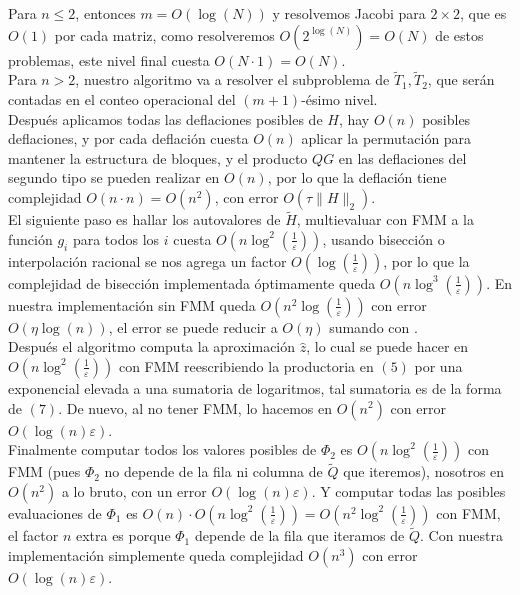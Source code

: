 \documentclass[11pt,a4paper]{article}
\begin{document}
Para $n\leq 2$, entonces $m=O(\log(N))$ y resolvemos Jacobi para $2\times 2$, que es $O(1)$ por cada matriz, como resolveremos $O(2^{\log(N)})=O(N)$ de estos problemas, este nivel final cuesta $O(N \cdot 1)=O(N)$.\\

Para $n>2$, nuestro algoritmo va a resolver el subproblema de $\tilde T _1, \tilde T_2$, que serán contadas en el conteo operacional del $(m+1)$-ésimo nivel.\\

Después aplicamos todas las deflaciones posibles de $H$, hay $O(n)$ posibles deflaciones, y por cada deflación cuesta $O(n)$ aplicar la permutación para mantener la estructura de bloques, y el producto $QG$ en las deflaciones del segundo tipo se pueden realizar en $O(n)$, por lo que la deflación tiene complejidad $O(n \cdot n)=O(n^2)$, con error $O(\tau \|H\|_2)$.\\

El siguiente paso es hallar los autovalores de $\tilde{H}$, multievaluar con FMM a la función $g_i$ para todos los $i$ cuesta $O(n\log^2(\frac1\varepsilon))$, usando bisección o interpolación racional se nos agrega un factor $O(\log(\frac1\varepsilon))$, por lo que la complejidad de bisección implementada óptimamente queda $O(n\log^3(\frac1\varepsilon))$. En nuestra implementación sin FMM queda $O(n^2\log(\frac1\varepsilon))$ con error $O(\eta \log(n))$, el error se puede reducir a $O(\eta)$ sumando con \cite{ExactSum}. \\

Después el algoritmo computa la aproximación $\hat{z}$, lo cual se puede hacer en $O(n\log^2(\frac1\varepsilon))$ con FMM reescribiendo la productoria en $(5)$ por una exponencial elevada a una sumatoria de logaritmos, tal sumatoria es de la forma de $(7)$. De nuevo, al no tener FMM, lo hacemos en $O(n^2)$ con error $O(\log(n)\varepsilon)$.\\

Finalmente computar todos los valores posibles de $\Phi_2$ es $O(n\log^2(\frac1\varepsilon))$ con FMM (pues $\Phi_2$ no depende de la fila ni columna de $\tilde Q$ que iteremos), nosotros en $O(n^2)$ a lo bruto, con un error $O(\log(n)\varepsilon)$. Y computar todas las posibles evaluaciones de $\Phi_1$ es $O(n) \cdot O(n\log^2(\frac1\varepsilon)) = O(n^2\log^2(\frac1\varepsilon))$ con FMM, el factor $n$ extra es porque $\Phi_1$ depende de la fila que iteramos de $\tilde Q$. Con nuestra implementación simplemente queda complejidad $O(n^3)$ con error $O(\log(n)\varepsilon)$.\\
\end{document}
